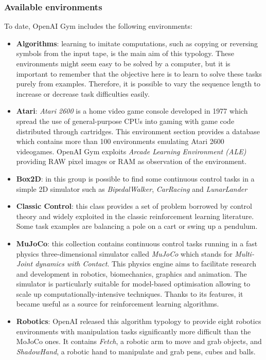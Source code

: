 \subsubsection{Available environments}

To date, OpenAI Gym includes the following environments:
\begin{itemize}
	\item \textbf{Algorithms}: learning to imitate computations, such as copying or reversing symbols from the input tape, is the main aim of this typology. These environments might seem easy to be solved by a computer, but it is important to remember that the objective here is to learn to solve these tasks purely from examples. Therefore, it is possible to vary the sequence length to increase or decrease task difficulties easily.
	\item \textbf{Atari}: \textit{Atari 2600} is a home video game console developed in 1977 which spread the use of general-purpose CPUs into gaming with game code distributed through cartridges. This environment section provides a database which contains more than 100 environments emulating Atari 2600 videogames. OpenAI Gym exploits \textit{Arcade Learning Environment (ALE)} \cite{bellemare2013arcade} providing RAW pixel images or RAM as observation of the environment.
	\item \textbf{Box2D}: in this group is possible to find some continuous control tasks in a simple 2D simulator such as \textit{BipedalWalker}, \textit{CarRacing} and \textit{LunarLander}
	\item \textbf{Classic Control}: this class provides a set of problem borrowed by control theory and widely exploited in the classic reinforcement learning literature. Some task examples are balancing a pole on a cart or swing up a pendulum.
	\item \textbf{MuJoCo}: this collection contains continuous control tasks running in a fast physics three-dimensional simulator called \textit{MuJoCo} which stands for \textit{Multi-Joint dynamics with Contact}. This physics engine aims to facilitate research and development in robotics, biomechanics, graphics and animation. The simulator is particularly suitable for model-based optimisation allowing to scale up computationally-intensive techniques.
	      Thanks to its features, it became useful as a source for reinforcement learning algorithms. \cite{todorov2012mujoco}
	\item \textbf{Robotics}: OpenAI released this algorithm typology to provide eight robotics environments with manipulation tasks significantly more difficult than the MoJoCo ones. It contains \textit{Fetch}, a robotic arm to move and grab objects, and \textit{ShadowHand}, a robotic hand to manipulate and grab pens, cubes and balls. \cite{ingredientsRoboticsResearch}
\end{itemize}

